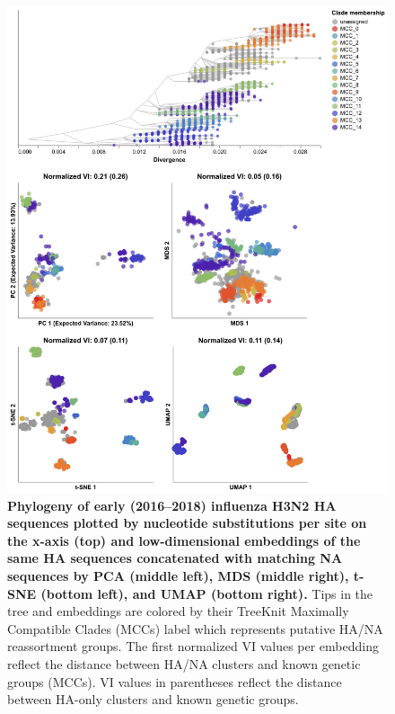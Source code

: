 \documentclass[10pt,letterpaper]{article}
\begin{document}
\begin{figure}[!h]
\includegraphics[width=\columnwidth]{figures/flu-2016-2018-ha-na-embeddings-by-mcc.png}
\caption{{\bf Phylogeny of early (2016--2018) influenza H3N2 HA sequences plotted by nucleotide substitutions per site on the x-axis (top) and low-dimensional embeddings of the same HA sequences concatenated with matching NA sequences by PCA (middle left), MDS (middle right), t-SNE (bottom left), and UMAP (bottom right).}
  Tips in the tree and embeddings are colored by their TreeKnit Maximally Compatible Clades (MCCs) label which represents putative HA/NA reassortment groups.
  The first normalized VI values per embedding reflect the distance between HA/NA clusters and known genetic groups (MCCs).
  VI values in parentheses reflect the distance between HA-only clusters and known genetic groups.
}
\label{fig:seasonal-influenza-h3n2-ha-na-2016-2018-embeddings}
\end{figure}
\end{document}
